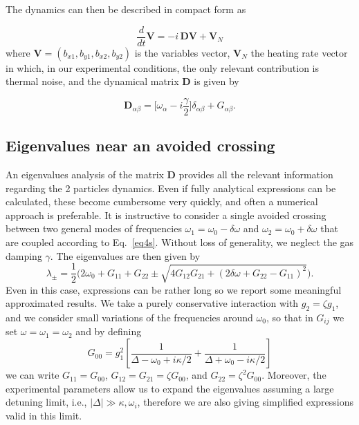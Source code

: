 \documentclass[aps,PRA,%
 amsmath,amssymb,
singlecolumn,
notitlepage,superscriptaddress,groupedaddress]{revtex4}
\newcommand{\di}{i}
\begin{document}
The dynamics can then be described in compact form as

\begin{equation}\label{eqs_dyn}
    \frac{d}{dt}\mathbf{V}=-\di\,\mathbf{D}\mathbf{V}+\mathbf{V}_N
\end{equation}
\noindent where $\mathbf{V}=(b_{x1},b_{y1},b_{x2},b_{y2})$ is the variables vector, $\mathbf{V}_N$ the heating rate vector in which, in our experimental conditions, the only relevant contribution is thermal noise, and the dynamical matrix $\mathbf{D}$ is given by

\begin{equation}\label{eq3s}
    \mathbf{D}_{\alpha\beta}=\bigg[\omega_\alpha-\di\frac{\gamma}{2}\bigg]\delta_{\alpha\beta}+G_{\alpha\beta}.
\end{equation}

\subsection{Eigenvalues near an avoided crossing}\label{sec_eigen}
An eigenvalues analysis of the matrix $\mathbf{D}$ provides all the relevant information regarding the 2 particles dynamics. Even if fully analytical expressions can be calculated, these become cumbersome very quickly, and often a numerical approach is preferable. It is instructive to consider a single avoided crossing between two general modes of frequencies $\omega_1=\omega_0-\delta\omega$ and  $\omega_2=\omega_0+\delta\omega$ that are coupled according to Eq.~\ref{eq4s}. Without loss of generality, we neglect the gas damping $\gamma$.  The eigenvalues are then given by
\begin{equation}
    \lambda_{\pm}=\frac{1}{2}\bigg(2  \omega_0+G_{11}+G_{22}\pm\sqrt{4G_{12}G_{21}+(2\delta\omega+G_{22}-G_{11})^2}\bigg).
\end{equation}
Even in this case, expressions can be rather long so we report some meaningful approximated results. We take a purely conservative interaction with $g_2=\zeta g_1$, and we consider small variations of the frequencies around $\omega_0$, so that in $G_{ij}$ we set $\omega=\omega_1=\omega_2$ and by defining 
\begin{equation}
    G_{00}= g_1^2 \left[ \frac{1}{\Delta-\omega_0+\di\kappa/2}+\frac{1}{\Delta+\omega_0-\di\kappa/2} \right]
\end{equation}
we can write $G_{11}=G_{00}$, $G_{12}=G_{21}=\zeta G_{00}$, and $G_{22}=\zeta^2 G_{00}$.
Moreover, the experimental parameters allow us to expand the eigenvalues assuming a large detuning limit, i.e., $\mid\Delta\mid\gg\kappa,\omega_i$, therefore we are also giving simplified expressions valid in this limit. 
\end{document}
